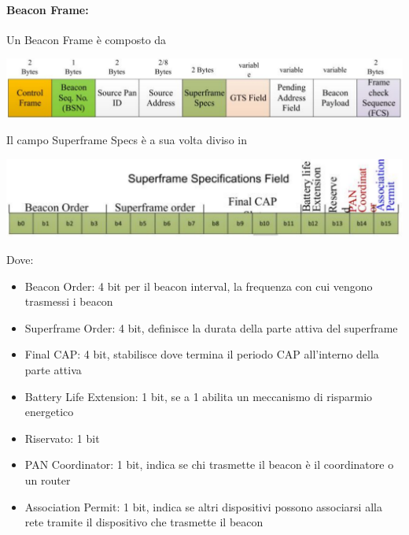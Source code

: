 \paragraph{Beacon Frame:} Un Beacon Frame è composto da
\begin{center}
	\includegraphics[width=0.95\linewidth]{img/wpan/zbframe}
\end{center}

Il campo Superframe Specs è a sua volta diviso in 
\begin{center}
	\includegraphics[width=0.75\linewidth]{img/wpan/zssf}
\end{center}

Dove:
\begin{itemize}
	\item Beacon Order: 4 bit per il beacon interval, la frequenza con cui vengono trasmessi i beacon
	\item Superframe Order: 4 bit, definisce la durata della parte attiva del superframe
	\item Final CAP: 4 bit, stabilisce dove termina il periodo CAP all'interno della parte attiva
	\item Battery Life Extension: 1 bit, se a 1 abilita un meccanismo di risparmio energetico
	\item Riservato: 1 bit
	\item PAN Coordinator: 1 bit, indica se chi trasmette il beacon è il coordinatore o un router
	\item Association Permit: 1 bit, indica se altri dispositivi possono associarsi alla rete tramite il dispositivo che trasmette il beacon
\end{itemize}

